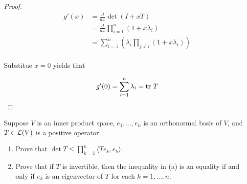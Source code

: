 \documentclass{extarticle}
\begin{document}
\begin{proof}
\begin{align*}
    g'(x) &= \frac{d}{dx} \det (I + x T) \\ 
    &= \frac{d}{dx} \prod_{i=1}^{n} (1 + x \lambda_i) \\ 
    &= \sum_{i=1}^{n} \left( \lambda_i \prod_{j \neq i} \left( 1 + x \lambda_i \right) \right) \\ 
\end{align*}

Substitue \(x = 0\) yields that 

\[g'(0) = \sum_{i=1}^{n} \lambda_i = \tr \ T\]

\end{proof}


\begin{problem}{19}
    Suppose \(V\) is an inner product space, \(e_1, \ldots, e_n\) is an orthonormal basis of \(V\), 
    and \(T \in \mathcal{L}(V)\) is a positive operator. 
    \begin{enumerate}[label=(\alph*)]
        \item Prove that \(\det T \leq \prod_{k=1}^{n} \langle Te_k,e_k \rangle\). 
        \item Prove that if \(T\) is invertible, then the inequality in (a) is an equality if and only 
        if \(e_k\) is an eigenvector of \(T\) for each \(k = 1, \ldots, n\). 
    \end{enumerate}
\end{problem}
\end{document}
